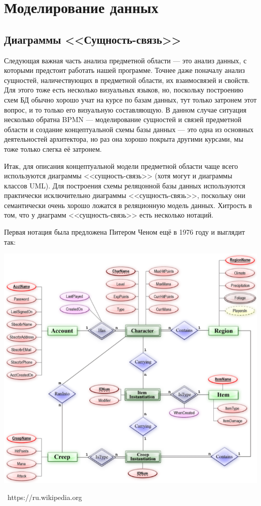 \documentclass[a5paper]{article}
\newcommand{\attribution}[1] {
    \vspace{-4mm}\begin{flushright}\begin{scriptsize}%
    {\textcopyright\, #1}\end{scriptsize}\end{flushright}
}
\begin{document}
\section{Моделирование данных}

\subsection{Диаграммы <<Сущность-связь>>}

Следующая важная часть анализа предметной области --- это анализ данных, с которыми предстоит работать нашей программе. Точнее даже поначалу анализ сущностей, наличествующих в предметной области, их взаимосвязей и свойств. Для этого тоже есть несколько визуальных языков, но, поскольку построению схем БД обычно хорошо учат на курсе по базам данных, тут только затронем этот вопрос, и то только его визуальную составляющую. В данном случае ситуация несколько обратна BPMN --- моделирование сущностей и связей предметной области и создание концептуальной схемы базы данных --- это одна из основных деятельностей архитектора, но раз она хорошо покрыта другими курсами, мы тоже только слегка её затронем.

Итак, для описания концептуальной модели предметной области чаще всего используются диаграммы <<сущность-связь>> (хотя могут и диаграммы классов UML). Для построения схемы реляцонной базы данных используются практически исключительно диаграммы <<сущность-связь>>, поскольку они семантически очень хорошо ложатся в реляционную модель данных. Хитрость в том, что у диаграмм <<сущность-связь>> есть несколько нотаций.

Первая нотация была предложена Питером Ченом ещё в 1976 году и выглядит так:

\begin{center}
    \includegraphics[width=\textwidth]{erChenNotation.png}
    \attribution{https://ru.wikipedia.org}
\end{center}
\end{document}

